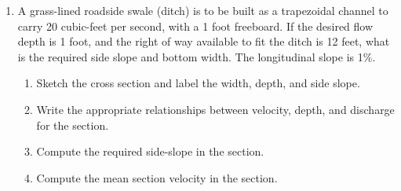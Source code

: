 \documentclass[12pt]{article}
\begin{document}
\begin{enumerate}
\item A grass-lined roadside swale (ditch) is to be built as a trapezoidal channel to carry 20 cubic-feet per second, with a 1 foot freeboard.   If the desired flow depth is 1 foot, and the right of way available to fit the ditch is 12 feet, what is the required side slope and bottom width.   The longitudinal slope is 1\%.
\begin{enumerate}[i]
\item Sketch the cross section and label the width, depth, and side slope.
\item Write the appropriate relationships between velocity, depth, and discharge for the section.
\item Compute the required side-slope in the section.
\item Compute the mean section velocity in the section.
\end{enumerate}


\end{enumerate}
\end{document}
